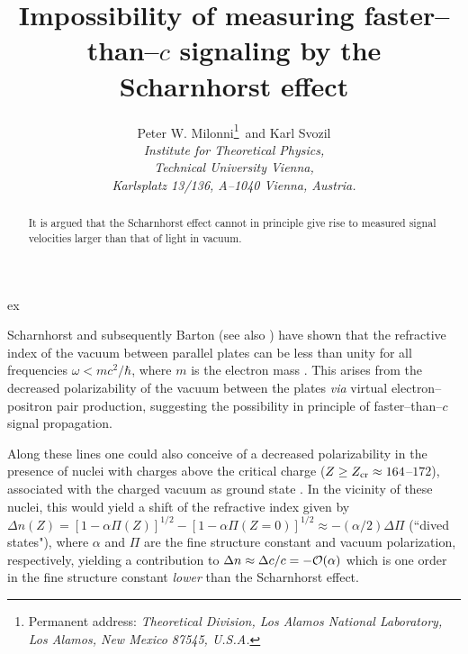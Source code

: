 
\title{Impossibility of measuring faster--than--$c$ signaling
by the Scharnhorst effect}
\author{Peter W. Milonni\thanks{Permanent address: {\it
Theoretical Division, Los Alamos National Laboratory, Los Alamos, New
Mexico 87545, U.S.A.}} $\,$and Karl Svozil\\
{\small \sl Institute for Theoretical Physics,}\\
{\small \sl Technical University Vienna,}\\
{\small \sl Karlsplatz 13/136, A--1040 Vienna, Austria.}
}
 \date{}

\maketitle
\begin{abstract}
It is argued that the Scharnhorst effect cannot in principle give rise to
measured signal velocities larger than that of light in vacuum.
\end{abstract}
 ex

Scharnhorst \cite{scharnhorst} and subsequently Barton \cite{barton}
(see also \cite{barnett})
have
shown that the refractive index of the vacuum between parallel plates
can be less than unity for all frequencies $\omega < mc^2/\hbar$, where
$m$ is the electron mass \cite{f1}.
This arises from
the decreased polarizability of the vacuum between the plates {\it via}
virtual electron--positron pair production,
suggesting the possibility in principle of faster--than--$c$ signal
propagation.

Along these lines one could also conceive of a decreased polarizability
in the presence of
nuclei with charges above the critical charge ($Z\ge Z_{\rm
cr}\approx 164$--$172$),
associated with the charged vacuum as ground state \cite{greiner}. In
the vicinity of these nuclei, this would yield
a shift of the refractive index given by
 $\Delta n
(Z) = [1-\alpha \Pi
(Z)]^{1/2}- [1-\alpha \Pi (Z=0)]^{1/2} \approx -( \alpha /2)\Delta \Pi$
(``dived  states"), where $\alpha$ and $\Pi$ are the fine structure constant and
vacuum polarization, respectively, yielding a contribution to $\Delta n\approx
\Delta c/c=-{\cal O}(\alpha )$ which is one
order in the fine structure constant {\sl lower} than
the Scharnhorst effect.


